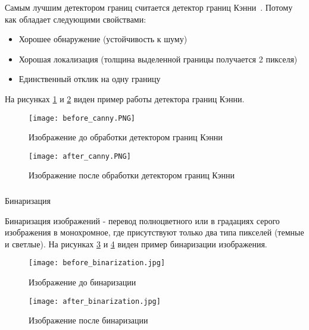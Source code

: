 Самым лучшим детектором границ считается детектор границ Кэнни~\cite{canny_edge_detector}. Потому как обладает следующими свойствами:
\begin{itemize}
  \item Хорошее обнаружение (устойчивость к шуму)
  \item Хорошая локализация (толщина выделенной границы получается 2 пикселя)
  \item Единственный отклик на одну границу
\end{itemize}

На рисунках \ref{fig:domain:image_processing:edges_detection:before_canny} и \ref{fig:domain:image_processing:edges_detection:after_canny} виден пример работы детектора границ Кэнни. 

\begin{figure}[ht]
\centering
    \texttt{[image: before\_canny.PNG]}  
    \caption{Изображение до обработки детектором границ Кэнни}
    \label{fig:domain:image_processing:edges_detection:before_canny}
\end{figure}

\begin{figure}[ht]
\centering
    \texttt{[image: after\_canny.PNG]}  
    \caption{Изображение после обработки детектором границ Кэнни}
    \label{fig:domain:image_processing:edges_detection:after_canny}
\end{figure}


\subsubsection{}
\label{sub:temp:image_processing:binary}
Бинаризация

Бинаризация изображений - перевод полноцветного или в градациях серого изображения в монохромное, где присутствуют только два типа пикселей (темные и светлые)\cite{binary_image}. На рисунках \ref{fig:domain:image_processing:binary:before_binarization} и \ref{fig:domain:image_processing:binary:after_binarization} виден пример бинаризации изображения.

\begin{figure}[ht]
\centering
    \texttt{[image: before\_binarization.jpg]}  
    \caption{Изображение до бинаризации}
    \label{fig:domain:image_processing:binary:before_binarization}
\end{figure}
\begin{figure}[ht]
\centering
    \texttt{[image: after\_binarization.jpg]}  
    \caption{Изображение после бинаризации}
    \label{fig:domain:image_processing:binary:after_binarization}
\end{figure}

